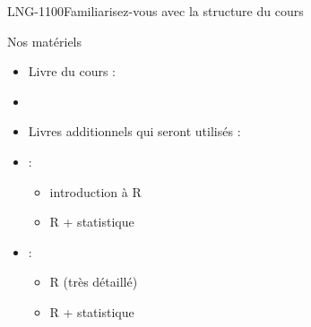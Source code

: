 \documentclass[xcolor=dvipsnames, onlymath, 10pt, aspectratio=169, handout]{beamer}
\begin{document}

\begin{frame}{LNG-1100}{Familiarisez-vous avec la structure du cours}

	\begin{center}
	\end{center}

\end{frame}



\begin{frame}{Nos matériels}

	\begin{itemize}
		\item[\winner] Livre du cours : {} 
		\item[]
		\item Livres additionnels qui seront utilisés :

		\item[]  :
		      \begin{itemize}
			      \item[] \citet{barnier_R} \hfill introduction à R
			      \item[] \citet{larmarange2023} \hfill R + statistique
		      \end{itemize}

		\item[]  :
		      \begin{itemize}
			      \item \citet{wickham_rdata2023} \hfill R (très détaillé)
			      \item \citet{garcia_2021_dvaslr}\hfill R + statistique
		      \end{itemize}
	\end{itemize}

\end{frame}

\end{document}
